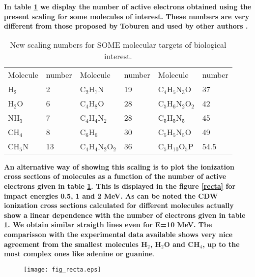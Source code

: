 \documentclass[preprint,12pt]{article}
\begin{document}
\textbf{In table \ref{nn} we display the number of active electrons 
obtained using the present scaling for some molecules of interest. These 
numbers are very different from those proposed by Toburen \cite{} and 
used by other authors \cite{Itoh,others}.}


\begin{table}
\begin{center}
\begin{tabular}{llllll}
\hline
 Molecule & number &Molecule         &number & Molecule             &number \\
 H$_2$    & 2  & C$_2$H$_7$N         & 19    & C$_4$H$_5$N$_3$O     & 37    \\
 H$_2$O   & 6  & C$_4$H$_8$O         & 28    & C$_5$H$_6$N$_2$O$_2$ & 42    \\
 NH$_3$   & 7  & C$_4$H$_4$N$_2$     & 28    & C$_5$H$_5$N$_5$      & 45    \\
 CH$_4$   & 8  & C$_6$H$_6$          & 30    & C$_5$H$_5$N$_5$O     & 49    \\
 CH$_5$N  & 13 & C$_4$H$_4$N$_2$O$_2$& 36    & C$_5$H$_{10}$O$_5$P  & 54.5  \\
 \hline
\end{tabular}
\caption{New scaling numbers for SOME molecular targets of biological interest.}
\label{nn}
\end{center}
\end{table}

\textbf{An alternative way of showing this scaling is to plot the ionization cross sections of molecules as a function of the number of active electrons given in table \ref{nn}. This is displayed in the figure \ref{recta} for impact energies 0.5, 1 and 2 MeV. As can be noted the CDW ionization cross sections calculated for different molecules actually show a linear dependence with the number of electrons given in table \ref{nn}. We obtain similar straigth lines even for E=10 MeV. The comparisson with the experimental data available shows very nice agreement from the smallest molecules H$_2$, H$_2$O and CH$_4$, up to the most complex ones like adenine or guanine}.

\begin{figure}[H]
\centering
\texttt{[image: fig\_recta.eps]}
\end{figure}
\end{document}

